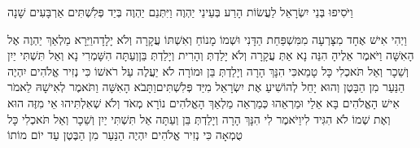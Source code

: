 \documentclass[../main/main.tex]{subfiles}
\begin{document}
\begin{multicols*}{\ncols}
וַיֹּסִיפוּ בְּנֵי יִשְׂרָאֵל לַעֲשׂוֹת הָרַע בְּעֵינֵי יַהְוֶה וַיִּתְּנֵם יַהְוֶה בְּיַד פְּלִשְׁתִּים אַרְבָּעִים שָׁנָה\OpenSection{}\par
{}וַיְהִי אִישׁ אֶחָד מִצָּרְעָה מִמִּשְׁפַּחַת הַדָּנִי וּשְׁמוֹ מָנוֹחַ וְאִשְׁתּוֹ עֲקָרָה וְלֹא יָלָדָה\PreVerseSpace{}וַיֵּרָא מַלְאַךְ יַהְוֶה אֶל הָאִשָּׁה וַיֹּאמֶר אֵלֶיהָ הִנֵּה נָא אַתְּ עֲקָרָה וְלֹא יָלַדְתְּ וְהָרִית וְיָלַדְתְּ בֵּן\PreVerseSpace{}וְעַתָּה הִשָּׁמְרִי נָא וְאַל תִּשְׁתִּי יַיִן וְשֵׁכָר וְאַל תֹּאכְלִי כָּל טָמֵא\PreVerseSpace{}כִּי הִנָּךְ הָרָה וְיָלַדְתְּ בֵּן וּמוֹרָה לֹא יַעֲלֶה עַל רֹאשׁוֹ כִּי נְזִיר אֱלֹהִים יִהְיֶה הַנַּעַר מִן הַבָּטֶן וְהוּא יָחֵל לְהוֹשִׁיעַ אֶת יִשְׂרָאֵל מִיַּד פְּלִשְׁתִּים\PreVerseSpace{}וַתָּבֹא הָאִשָּׁה וַתֹּאמֶר לְאִישָׁהּ לֵאמֹר אִישׁ הָאֱלֹהִים בָּא אֵלַי וּמַרְאֵהוּ כְּמַרְאֵה מַלְאַךְ הָאֱלֹהִים נוֹרָא מְאֹד וְלֹא שְׁאִלְתִּיהוּ אֵי מִזֶּה הוּא וְאֶת שְׁמוֹ לֹא הִגִּיד לִי\PreVerseSpace{}וַיֹּאמֶר לִי הִנָּךְ הָרָה וְיָלַדְתְּ בֵּן וְעַתָּה אַל תִּשְׁתִּי יַיִן וְשֵׁכָר וְאַל תֹּאכְלִי כָּל טֻמְאָה כִּי נְזִיר אֱלֹהִים יִהְיֶה הַנַּעַר מִן הַבֶּטֶן עַד יוֹם מוֹתוֹ\OpenSection{}\par

\end{multicols*}
\end{document}

